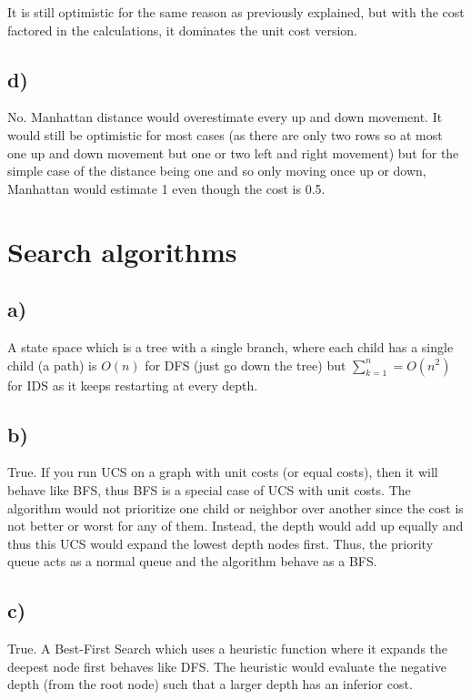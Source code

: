 \documentclass[11pt,letterpaper]{article}
\begin{document}
		It is still optimistic for the same reason as previously explained, but with the cost factored in the calculations, it dominates the unit cost version.
		
		\subsection{d)}
		No.
		Manhattan distance would overestimate every up and down movement.
		It would still be optimistic for most cases (as there are only two rows so at most one up and down movement but one or two left and right movement) but for the simple case of the distance being one and so only moving once up or down, Manhattan would estimate 1 even though the cost is 0.5.
		
	\section{Search algorithms}
	    \subsection{a)}
	    A state space which is a tree with a single branch, where each child has a single child (a path) is $O(n)$ for DFS (just go down the tree) but $\sum_{k=1}^{n} = O(n^2)$ for IDS as it keeps restarting at every depth.
	    
	    \subsection{b)}
	    True.
	    If you run UCS on a graph with unit costs (or equal costs), then it will behave like BFS, thus BFS is a special case of UCS with unit costs.
	    The algorithm would not prioritize one child or neighbor over another since the cost is not better or worst for any of them.
	    Instead, the depth would add up equally and thus this UCS would expand the lowest depth nodes first.
	    Thus, the priority queue acts as a normal queue and the algorithm behave as a BFS.
	    
	    \subsection{c)}
	    True.
	    A Best-First Search which uses a heuristic function where it expands the deepest node first behaves like DFS.
	    The heuristic would evaluate the negative depth (from the root node) such that a larger depth has an inferior cost.
	    
\end{document}
